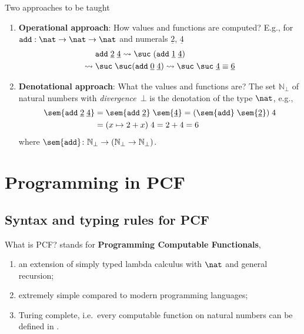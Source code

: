 \begin{frame}{Two approaches to be taught}
  \begin{enumerate}
    \item \textbf{Operational approach}: How values and functions are computed?
      E.g., for $\mathtt{add}:\nat \to \nat \to\nat$ and numerals
      $\underline{2}$, $\underline{4}$
      \begin{align*}
        & \mathtt{add}\;\underline{2}\;\underline{4}
        \leadsto \suc\;(\mathtt{add}\; \underline{1}\;\underline{4}) \\
        \leadsto{} & \suc\;\suc(\mathtt{add}\; \underline{0}\;\underline{4})
        \leadsto \suc\;\suc\;\underline{4} \equiv
        \underline{6}
      \end{align*}
    \item \textbf{Denotational approach}: What the values and functions are?
      The set $\mathbb{N}_\bot$ of natural numbers with
      \emph{divergence}~$\bot$ is the denotation of the type $\nat$, e.g., 
      \begin{align*}
        \sem{\mathtt{add}\;\underline{2}\;\underline{4}} 
        & = \sem{\mathtt{add}\;\underline{2}}\;\sem{\underline{4}} 
        = (\sem{\mathtt{add}}\;\sem{\underline{2}}) \;4  \\
        & = (x \mapsto 2 + x)\;4 
        = 2 + 4 = 6
      \end{align*}
      where $\sem{\mathtt{add}}\colon \mathbb{N}_\bot \to (\mathbb{N}_\bot \to
      \mathbb{N}_\bot)$. 
  \end{enumerate}
\end{frame}

\section{Programming in PCF}

\subsection{Syntax and typing rules for PCF}

\begin{frame}{What is PCF?}
  \PCF{} stands for \textbf{Programming Computable Functionals}, 
  \begin{enumerate}
    \item an extension of simply typed lambda calculus with $\nat$ and
      general recursion; 
    \item extremely simple compared to modern programming languages;
    \item Turing complete, i.e.\ every computable function on natural numbers
      can be defined in \PCF.
  \end{enumerate}
\end{frame}


